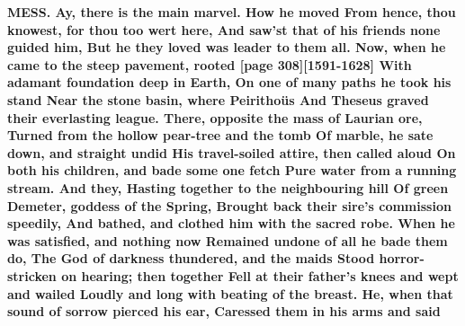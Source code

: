 \documentclass[11pt,letter]{book}
\begin{document}
\par \textbf{MESS. Ay, there is the main marvel. How he moved From hence, thou knowest, for thou too wert here, And saw’st that of his friends none guided him, But he they loved was leader to them all. Now, when he came to the steep pavement, rooted [page 308][1591-1628] With adamant foundation deep in Earth, On one of many paths he took his stand Near the stone basin, where Peirithoüs And Theseus graved their everlasting league. There, opposite the mass of Laurian ore, Turned from the hollow pear-tree and the tomb Of marble, he sate down, and straight undid His travel-soiled attire, then called aloud On both his children, and bade some one fetch Pure water from a running stream. And they, Hasting together to the neighbouring hill Of green Demeter, goddess of the Spring, Brought back their sire’s commission speedily, And bathed, and clothed him with the sacred robe. When he was satisfied, and nothing now Remained undone of all he bade them do, The God of darkness thundered, and the maids Stood horror-stricken on hearing; then together Fell at their father’s knees and wept and wailed Loudly and long with beating of the breast. He, when that sound of sorrow pierced his ear, Caressed them in his arms and said}
\end{document}
